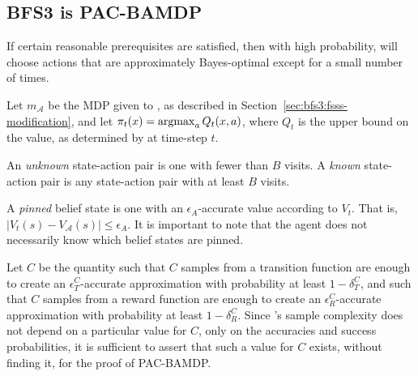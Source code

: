 \subsection{BFS3 is PAC-BAMDP}
\label{sec:bfs3:pac-bamdp-informal}

If certain reasonable prerequisites are satisfied, then with high probability,  will choose actions that are approximately Bayes-optimal except for a small number of times.

\begin{defn}
Let $m_\mathcal{A}$ be the MDP given to , as described in Section~\ref{sec:bfs3:fsss-modification}, and let $\pi_t(x) = \argmax_a Q_t(x,a)$, where $Q_t$ is the upper bound on the value, as determined by  at time-step $t$.
\end{defn}

\begin{defn}
An \emph{unknown} state-action pair is one with fewer than $B$ visits. A \emph{known} state-action pair is any state-action pair with at least $B$ visits.
\end{defn}

\begin{defn}
A \emph{pinned} belief state is one with an $\epsilon_A$-accurate value according to $V_t$. That is, $|V_t(s)-V_{\mathcal{A}}(s)|\leq\epsilon_A$. It is important to note that the agent does not necessarily know which belief states are pinned.
\end{defn}

\begin{defn}
Let $C$ be the quantity such that $C$ samples from a transition function are enough to create an $\epsilon_T^C$-accurate approximation with probability at least $1-\delta_T^C$, and such that $C$ samples from a reward function are enough to create an $\epsilon_R^C$-accurate approximation with probability at least $1-\delta_R^C$. Since 's sample complexity does not depend on a particular value for $C$, only on the accuracies and success probabilities, it is sufficient to assert that such a value for $C$ exists, without finding it, for the proof of PAC-BAMDP.
\end{defn}

